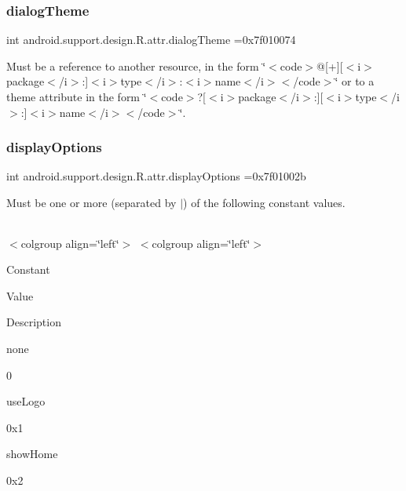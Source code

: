 \subsubsection{\texorpdfstring{dialog\+Theme}{dialogTheme}}
{\footnotesize\ttfamily int android.\+support.\+design.\+R.\+attr.\+dialog\+Theme =0x7f010074\hspace{0.3cm}{\ttfamily [static]}}

Must be a reference to another resource, in the form \char`\"{}$<$code$>$@\mbox{[}+\mbox{]}\mbox{[}$<$i$>$package$<$/i$>$\+:\mbox{]}$<$i$>$type$<$/i$>$\+:$<$i$>$name$<$/i$>$$<$/code$>$\char`\"{} or to a theme attribute in the form \char`\"{}$<$code$>$?\mbox{[}$<$i$>$package$<$/i$>$\+:\mbox{]}\mbox{[}$<$i$>$type$<$/i$>$\+:\mbox{]}$<$i$>$name$<$/i$>$$<$/code$>$\char`\"{}. \mbox{\label{classandroid_1_1support_1_1design_1_1R_1_1attr_a17a2e287c786fb6fbf1e77f6b90877c7}} 
\subsubsection{\texorpdfstring{display\+Options}{displayOptions}}
{\footnotesize\ttfamily int android.\+support.\+design.\+R.\+attr.\+display\+Options =0x7f01002b\hspace{0.3cm}{\ttfamily [static]}}

Must be one or more (separated by \textquotesingle{}$\vert$\textquotesingle{}) of the following constant values.

\tabulinesep=1mm
\begin{longtabu} spread 0pt [c]{*{0}{|X[-1]}|}
\hline
\end{longtabu}
$<$colgroup align=\char`\"{}left\char`\"{}$>$ $<$colgroup align=\char`\"{}left\char`\"{}$>$ 

Constant

Value

Description 

{\ttfamily none}

0

{\ttfamily use\+Logo}

0x1

{\ttfamily show\+Home}

0x2

